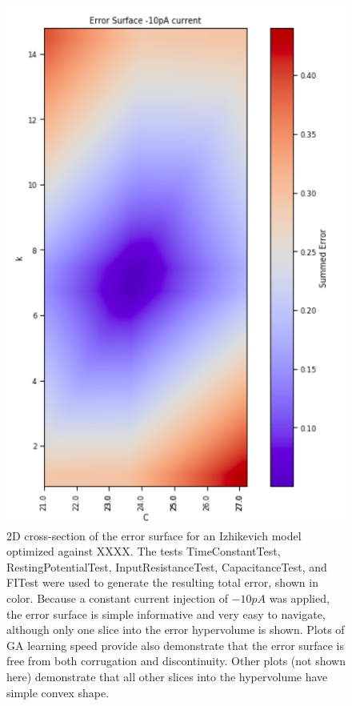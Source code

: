 \begin{figure}
    \centering
    \includegraphics[scale=0.7]{figures/friendly_error_surface.png}
    \caption[Constant Currents Produce Tractable Error Surfaces]{2D cross-section of the error surface for an Izhikevich model optimized against XXXX. 
    The tests TimeConstantTest, RestingPotentialTest, InputResistanceTest,  CapacitanceTest, and FITest were used to generate the resulting total error, shown in color.
    Because a constant current injection of $-10pA$ was applied, the error surface is simple informative and very easy to navigate, although only one slice into the error hypervolume is shown. Plots of GA learning speed provide also demonstrate that the error surface is free from both corrugation and discontinuity. Other plots (not shown here) demonstrate that all other slices into the hypervolume have simple convex shape.}
    \label{fig:constant_current}
\end{figure}

